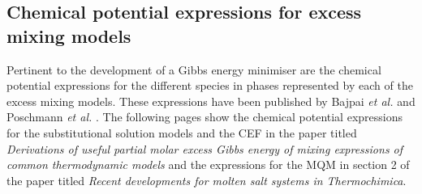 	\subsection{Chemical potential expressions for excess mixing models}
	Pertinent to the development of a Gibbs energy minimiser are the chemical potential expressions for the different species in phases represented by each of the excess mixing models. These expressions have been published by Bajpai \textit{et al.} \cite{Bajpai:2021aa} and Poschmann \textit{et al.} \cite{Poschmann:2021ab}. The following pages show the chemical potential expressions for the substitutional solution models and the CEF in the paper titled \textit{Derivations of useful partial molar excess Gibbs energy of mixing expressions of common thermodynamic models} and the expressions for the MQM in section 2 of the paper titled \textit{Recent developments for molten salt systems in Thermochimica}. 
	
	
